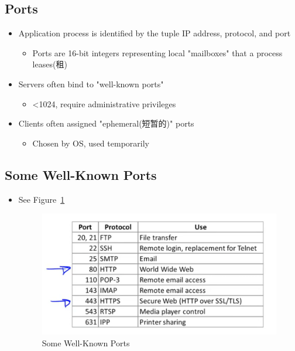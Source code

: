 \documentclass[12pt]{ctexart}   %
\begin{document}
	\subsection{Ports}
	\begin{itemize}
		\item Application process is identified by the tuple IP address, protocol, and port
		\begin{itemize}
			\item Ports are 16-bit integers representing local "mailboxes" that a process leases(租)
		\end{itemize}
		
		\item Servers often bind to "well-known ports"
		\begin{itemize}
			\item <1024, require administrative privileges
		\end{itemize}
		
		\item Clients often assigned "ephemeral(短暂的)" ports
		\begin{itemize}
			\item Chosen by OS, used temporarily
		\end{itemize}
	\end{itemize}
	
	\subsection{Some Well-Known Ports}
	\begin{itemize}
		\item See Figure~\ref{fig:6-1-7}
		 
		 \begin{figure}[h!] %
		\centering
		 \includegraphics[scale=0.7]{images/6-1-7}
		\caption{ Some Well-Known Ports }
		 \label{fig:6-1-7}
		 \end{figure}
	\end{itemize}
	
\end{document}
